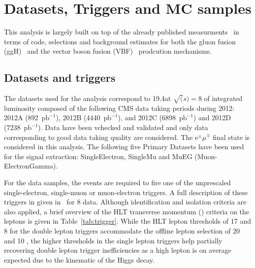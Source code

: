 \section{Datasets, Triggers and MC samples}
\label{sec:Datasets}

This analysis is largely built on top of the already published \hww measurments~\cite{Chatrchyan:2013iaa} in terms of code, selections and background estimates for both the gluon fusion (ggH)~\cite{AN-2013-022} and the vector boson fusion (VBF)~\cite{AN-13-097} prodcution mechanisms.

\subsection{Datasets and triggers\label{subsec:Datasets}}

The datasets used for the analysis correspond to 19.4\ifb at $\sqrt(s)=8$ \TeV  of integrated luminosity composed of the following CMS data taking periods during 2012: 2012A (892~$\mathrm{pb}^{-1}$), 2012B (4440~$\mathrm{pb}^{-1}$), and 2012C (6898~$\mathrm{pb}^{-1}$) and 2012D (7238~$\mathrm{pb}^{-1}$).
Data have been vchecked and validated and only data corresponding to good data taking quality are considered.
The $\mathrm{e}^{\pm}\mu^{\mp}$ final state is considered in this analysis.
The following five Primary Datasets have been used for the signal extraction: SingleElectron, SingleMu and MuEG (Muon-ElectronGamma).

For the data samples, the events are required to fire one of the unprescaled
single-electron, single-muon or muon-electron triggers.
A full description of these triggers in given in~\cite{AN-2012-228} for 8 \TeV data. Although identification and isolation criteria are
also applied, a brief overview of the HLT transverse momentum (\pt) criteria on the leptons
is given in Table~\ref{tab:trigger}. While the HLT lepton \pt thresholds of 17 and 8 \GeV for the double
lepton triggers accommodate the offline lepton \pt selection of 20 and 10 \GeV, the higher \pt thresholds
in the single lepton triggers help partially recovering double lepton trigger inefficiencies
as a high \pt lepton is on average expected due to the kinematic of the Higgs decay. 

